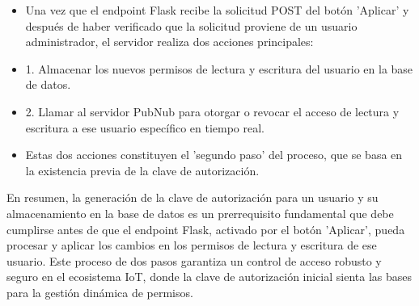 \documentclass{report}
\begin{document}
\begin{itemize}
        \begin{itemize}
            \item Una vez que el endpoint Flask recibe la solicitud POST del botón 'Aplicar' y después de haber verificado que la solicitud proviene de 
            un usuario administrador, el servidor realiza dos acciones principales:
                    \item 1. Almacenar los nuevos permisos de lectura y escritura del usuario en la base de datos.
                    \item 2. Llamar al servidor PubNub para otorgar o revocar el acceso de lectura y escritura a ese usuario específico en tiempo real.
            \item Estas dos acciones constituyen el 'segundo paso' del proceso, que se basa en la existencia previa de la clave de autorización.
        \end{itemize}
\end{itemize}
En resumen, la generación de la clave de autorización para un usuario y su almacenamiento en la base de datos es un prerrequisito 
fundamental que debe cumplirse antes de que el endpoint Flask, activado por el botón 'Aplicar', pueda procesar y aplicar los cambios 
en los permisos de lectura y escritura de ese usuario. Este proceso de dos pasos garantiza un control de acceso robusto y seguro en el 
ecosistema IoT, donde la clave de autorización inicial sienta las bases para la gestión dinámica de permisos.

\newpage


\end{document}
